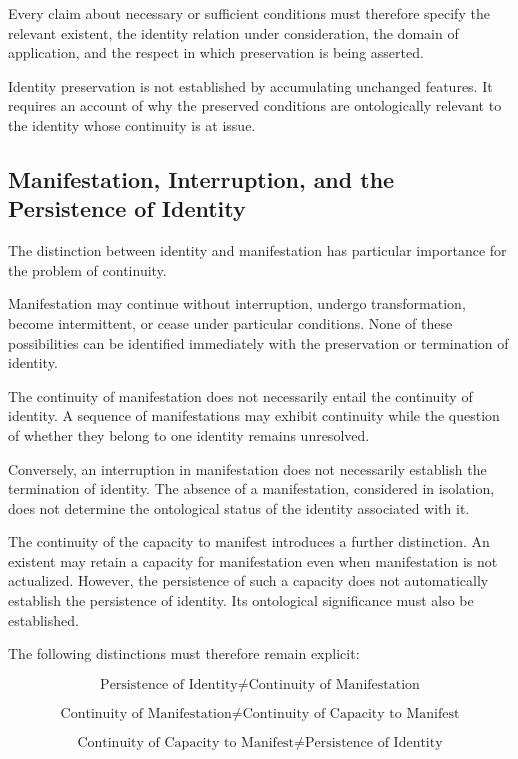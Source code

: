 Every claim about necessary or sufficient conditions must therefore specify
the relevant existent, the identity relation under consideration, the domain
of application, and the respect in which preservation is being asserted.

Identity preservation is not established by accumulating unchanged features.
It requires an account of why the preserved conditions are ontologically
relevant to the identity whose continuity is at issue.

\subsection{Manifestation, Interruption, and the Persistence of Identity}

The distinction between identity and manifestation has particular importance
for the problem of continuity.

Manifestation may continue without interruption, undergo transformation,
become intermittent, or cease under particular conditions. None of these
possibilities can be identified immediately with the preservation or
termination of identity.

The continuity of manifestation does not necessarily entail the continuity
of identity. A sequence of manifestations may exhibit continuity while
the question of whether they belong to one identity remains unresolved.

Conversely, an interruption in manifestation does not necessarily establish
the termination of identity. The absence of a manifestation, considered
in isolation, does not determine the ontological status of the identity
associated with it.

The continuity of the capacity to manifest introduces a further distinction.
An existent may retain a capacity for manifestation even when manifestation
is not actualized. However, the persistence of such a capacity does not
automatically establish the persistence of identity. Its ontological
significance must also be established.

The following distinctions must therefore remain explicit:

\[
\text{Persistence of Identity}
\neq
\text{Continuity of Manifestation}
\]

\[
\text{Continuity of Manifestation}
\neq
\text{Continuity of Capacity to Manifest}
\]

\[
\text{Continuity of Capacity to Manifest}
\neq
\text{Persistence of Identity}
\]

